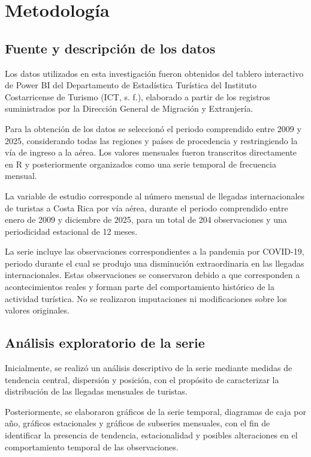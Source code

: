 \documentclass[12pt]{article}
\begin{document}
\section{Metodología}

\subsection{Fuente y descripción de los datos}

Los datos utilizados en esta investigación fueron obtenidos 
del tablero interactivo de Power BI del Departamento de 
Estadística Turística del Instituto Costarricense de 
Turismo (ICT, s. f.), elaborado a partir de los registros 
suministrados por la Dirección General de Migración y 
Extranjería.

Para la obtención de los datos se seleccionó el periodo 
comprendido entre 2009 y 2025, considerando todas las 
regiones y países de procedencia y restringiendo la vía 
de ingreso a la aérea. Los valores mensuales fueron 
transcritos directamente en R y posteriormente organizados 
como una serie temporal de frecuencia mensual.

La variable de estudio corresponde al número mensual
de llegadas internacionales de turistas a Costa Rica
por vía aérea, durante el periodo comprendido entre
enero de 2009 y diciembre de 2025, para un total de
204 observaciones y una periodicidad estacional de
12 meses.

La serie incluye las observaciones correspondientes
a la pandemia por COVID-19, periodo durante el cual
se produjo una disminución extraordinaria en las
llegadas internacionales. Estas observaciones se
conservaron debido a que corresponden a acontecimientos
reales y forman parte del comportamiento histórico
de la actividad turística. No se realizaron imputaciones
ni modificaciones sobre los valores originales.

\subsection{Análisis exploratorio de la serie}

Inicialmente, se realizó un análisis descriptivo de
la serie mediante medidas de tendencia central,
dispersión y posición, con el propósito de caracterizar
la distribución de las llegadas mensuales de turistas.

Posteriormente, se elaboraron gráficos de la serie
temporal, diagramas de caja por año, gráficos
estacionales y gráficos de subseries mensuales,
con el fin de identificar la presencia de tendencia,
estacionalidad y posibles alteraciones en el
comportamiento temporal de las observaciones.
\end{document}
